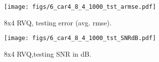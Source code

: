 								\begin{figure}[h!]
								\centering
								\texttt{[image: figs/6\_car4\_8\_4\_1000\_tst\_armse.pdf]}
								\caption{8x4 RVQ, testing error (avg. rmse).}
								\label{fig:6_car4_8_4_1000_tst_armse}
								\end{figure}

								\begin{figure}[h!]
								\centering
								\texttt{[image: figs/6\_car4\_8\_4\_1000\_tst\_SNRdB.pdf]}
								\caption{8x4 RVQ,testing SNR in dB.}
								\label{fig:6_car4_8_4_1000_tst_SNRdB}
								\end{figure}
